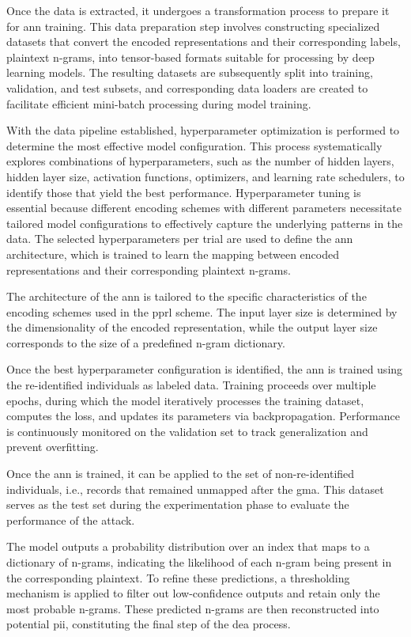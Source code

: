 Once the data is extracted, it undergoes a transformation process to prepare it for \ac{ann} training.
This data preparation step involves constructing specialized datasets that convert the encoded representations and their corresponding labels, plaintext n-grams, into tensor-based formats suitable for processing by deep learning models.
The resulting datasets are subsequently split into training, validation, and test subsets, and corresponding data loaders are created to facilitate efficient mini-batch processing during model training.

With the data pipeline established, hyperparameter optimization is performed to determine the most effective model configuration.
This process systematically explores combinations of hyperparameters, such as the number of hidden layers, hidden layer size, activation functions, optimizers, and learning rate schedulers, to identify those that yield the best performance.
Hyperparameter tuning is essential because different encoding schemes with different parameters necessitate tailored model configurations to effectively capture the underlying patterns in the data.
The selected hyperparameters per trial are used to define the \ac{ann} architecture, which is trained to learn the mapping between encoded representations and their corresponding plaintext n-grams.


The architecture of the \ac{ann} is tailored to the specific characteristics of the encoding schemes used in the \ac{pprl} scheme.
The input layer size is determined by the dimensionality of the encoded representation, while the output layer size corresponds to the size of a predefined n-gram dictionary.

Once the best hyperparameter configuration is identified, the \ac{ann} is trained using the re-identified individuals as labeled data.
Training proceeds over multiple epochs, during which the model iteratively processes the training dataset, computes the loss, and updates its parameters via backpropagation.
Performance is continuously monitored on the validation set to track generalization and prevent overfitting.

Once the \ac{ann} is trained, it can be applied to the set of non-re-identified individuals, i.e., records that remained unmapped after the \ac{gma}.
This dataset serves as the test set during the experimentation phase to evaluate the performance of the attack.

The model outputs a probability distribution over an index that maps to a dictionary of n-grams, indicating the likelihood of each n-gram being present in the corresponding plaintext.
To refine these predictions, a thresholding mechanism is applied to filter out low-confidence outputs and retain only the most probable n-grams.
These predicted n-grams are then reconstructed into potential \ac{pii}, constituting the final step of the \ac{dea} process.

